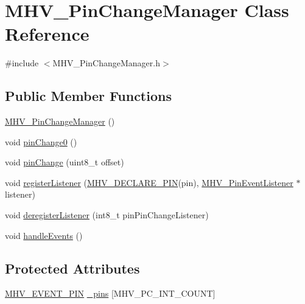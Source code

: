 \hypertarget{class_m_h_v___pin_change_manager}{\section{M\-H\-V\-\_\-\-Pin\-Change\-Manager Class Reference}
\label{class_m_h_v___pin_change_manager}
}


{\ttfamily \#include $<$M\-H\-V\-\_\-\-Pin\-Change\-Manager.\-h$>$}

\subsection*{Public Member Functions}
\begin{DoxyCompactItemize}
\item 
\hyperlink{class_m_h_v___pin_change_manager_a0f53c32cf969c858e7c0f5127f8ed760}{M\-H\-V\-\_\-\-Pin\-Change\-Manager} ()
\item 
void \hyperlink{class_m_h_v___pin_change_manager_a2e13f1107ef9406dd224f404176e4fde}{pin\-Change0} ()
\item 
void \hyperlink{class_m_h_v___pin_change_manager_af607081980ab2858f718f6ed0ae0f9f1}{pin\-Change} (uint8\-\_\-t offset)
\item 
void \hyperlink{class_m_h_v___pin_change_manager_a98acb7ef6fb6eab4cf35701e856de955}{register\-Listener} (\hyperlink{_m_h_v__io_8h_afb172d17be3890bb07e5ceec5a014b91}{M\-H\-V\-\_\-\-D\-E\-C\-L\-A\-R\-E\-\_\-\-P\-I\-N}(pin), \hyperlink{class_m_h_v___pin_event_listener}{M\-H\-V\-\_\-\-Pin\-Event\-Listener} $\ast$listener)
\item 
void \hyperlink{class_m_h_v___pin_change_manager_a9ff89d320dfbef1be042e0109aac091f}{deregister\-Listener} (int8\-\_\-t pin\-Pin\-Change\-Listener)
\item 
void \hyperlink{class_m_h_v___pin_change_manager_a241ab368e927b544737adadc2c4b45d0}{handle\-Events} ()
\end{DoxyCompactItemize}
\subsection*{Protected Attributes}
\begin{DoxyCompactItemize}
\item 
\hyperlink{_m_h_v___pin_change_manager_8h_a8690da5e1dbb6f0cb21bdb56a4982a66}{M\-H\-V\-\_\-\-E\-V\-E\-N\-T\-\_\-\-P\-I\-N} \hyperlink{class_m_h_v___pin_change_manager_afe6febbf14bb802401734219ef6b2eec}{\-\_\-pins} \mbox{[}M\-H\-V\-\_\-\-P\-C\-\_\-\-I\-N\-T\-\_\-\-C\-O\-U\-N\-T\mbox{]}
\end{DoxyCompactItemize}


